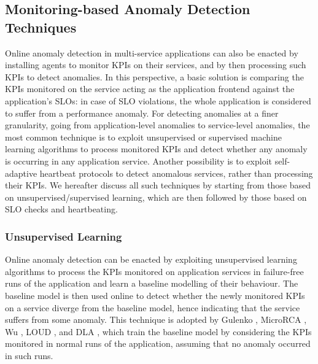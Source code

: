 \subsection{Monitoring-based Anomaly Detection Techniques}
\label{sec:detection:monitoring}
Online anomaly detection in multi-service applications can also be enacted by installing agents to monitor KPIs on their services, and by then processing such KPIs to detect anomalies.
In this perspective, a basic solution is comparing the KPIs monitored on the service acting as the application frontend against the application's SLOs: in case of SLO violations, the whole application is considered to suffer from a performance anomaly.
For detecting anomalies at a finer granularity, \viz going from application-level anomalies to service-level anomalies, the most common technique is to exploit unsupervised or supervised machine learning algorithms to process monitored KPIs and detect whether any anomaly is occurring in any application service.
Another possibility is to exploit self-adaptive heartbeat protocols to detect anomalous services, rather than processing their KPIs. 
We hereafter discuss all such techniques by starting from those based on unsupervised/supervised learning, which are then followed by those based on SLO checks and heartbeating.

\subsubsection{Unsupervised Learning}
\label{sec:detection:monitoring:unsupervised-learning}
Online anomaly detection can be enacted by exploiting unsupervised learning algorithms to process the KPIs monitored on application services in failure-free runs of the application and learn a baseline modelling of their behaviour.
The baseline model is then used online to detect whether the newly monitored KPIs on a service diverge from the baseline model, hence indicating that the service suffers from some anomaly.
This technique is adopted by Gulenko \etal \cite{37_Gulenko2018_DetectingAnomalousBehaviourBlackBoxServices}, MicroRCA \cite{04_Wu2020_MicroRCA}, Wu \etal \cite{09_Wu2020_MicroserviceDiagnosisDeepLearning}, LOUD \cite{13_Mariani2018_LocalizingFaultsCloudSystems}, and DLA \cite{14_Samir2019_DLA}, which train the baseline model by considering the KPIs monitored in normal runs of the application, \viz assuming that no anomaly occurred in such runs.

